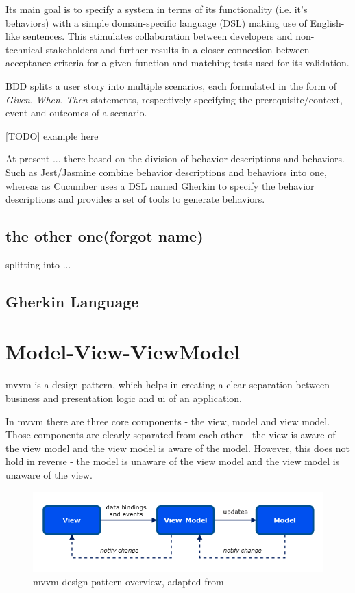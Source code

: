 Its main goal is to specify a system in terms of its functionality (i.e. it's behaviors) with a simple domain-specific language (DSL) making use of English-like sentences. This stimulates collaboration between developers and non-technical stakeholders and further results in a closer connection between acceptance criteria for a given function and matching tests used for its validation.

BDD splits a user story into multiple scenarios, each formulated in the form of \textit{Given}, \textit{When}, \textit{Then} statements, respectively specifying the prerequisite/context, event and outcomes of a scenario. 

[TODO] example here

At present ... there based on the division of behavior descriptions and behaviors. Such as Jest/Jasmine combine behavior descriptions and behaviors into one, whereas as Cucumber uses a DSL named Gherkin to specify the behavior descriptions and provides a set of tools to generate behaviors.


 \subsection{the other one(forgot name)}
 splitting into ...
\subsection{Gherkin Language}

\section{Model-View-ViewModel}
\label{sec:mvvm}
\gls{mvvm} is a design pattern, which helps in creating a clear separation between business and presentation logic and \gls{ui} of an application. \parencite[7-9]{microsoft_mvvm}

In \gls{mvvm} there are three core components - the view, model and view model. Those components are clearly separated from each other - the view is aware of the view model and the view model is aware of the model. However, this does not hold in reverse - the model is unaware of the view model and the view model is unaware of the view. 

\begin{figure}[H]
  \includegraphics[width=\textwidth]{images/mvvm.png}
   \caption{\gls{mvvm} design pattern overview, adapted from \parencite[7]{microsoft_mvvm}}
   \label{fig:mvvm}
 \end{figure}


